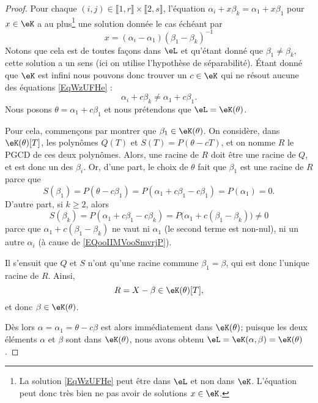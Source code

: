 \begin{proof}
    Pour chaque \( (i,j)\in \llbracket 1,r\rrbracket \times \llbracket 2,s\rrbracket \), l'équation \( \alpha_i+x\beta_k=\alpha_1+x\beta_1\) pour \( x\in \eK\) a au plus\footnote{La solution \eqref{EqWzUFHe} peut être dans $ \eL$ et non dans $\eK$. L'équation peut donc très bien ne pas avoir de solutions $x\in \eK$.} une solution donnée le cas échéant par
    \begin{equation}    \label{EqWzUFHe}
        x=(\alpha_i-\alpha_1)(\beta_1-\beta_k)^{-1}
    \end{equation}
    Notons que cela est de toutes façons dans \( \eL\) et qu'étant donné que \( \beta_1\neq \beta_k\), cette solution a un sens (ici on utilise l'hypothèse de séparabilité). Étant donné que \( \eK\) est infini nous pouvons donc trouver un \( c\in \eK\) qui ne résout aucune des équations \eqref{EqWzUFHe} :
    \begin{equation}\label{EQooIIMVooSmvrjP}
        \alpha_i+c\beta_k\neq \alpha_1+c\beta_1.
    \end{equation}
    Nous posons \( \theta=\alpha_1+c\beta_1\) et nous prétendons que \( \eL=\eK(\theta)\).

    Pour cela, commençons par montrer que \( \beta_1 \in \eK(\theta)\). On considère, dans \( \eK(\theta)[T]\), les polynômes \( Q(T)\) et \( S(T)=P(\theta-cT)\), et on nomme \( R\) le PGCD de ces deux polynômes. Alors, une racine de \( R\) doit être une racine de \( Q\), et est donc un des \( \beta_i\). Or, d'une part, le choix de \( \theta\) fait que \( \beta_1\) est une racine de \( R\) parce que
    \begin{equation}
        S(\beta_1)=P(\theta-c\beta_1)=P(\alpha_1+c\beta_1-c\beta_1)=P(\alpha_1)=0.
    \end{equation}
    D'autre part, si \( k\geq 2\), alors
    \begin{equation}
        S(\beta_k)=P(\alpha_1 + c \beta_1 - c \beta_k) = P\big(\alpha_1 +c(\beta_1-\beta_k)\big)\neq 0
    \end{equation}
    parce que \( \alpha_1 +c(\beta_1 - \beta_k)\) ne vaut ni \( \alpha_1 \) (le second terme est non-nul), ni un autre \( \alpha_i\) (à cause de \eqref{EQooIIMVooSmvrjP}).

    Il s'ensuit que \( Q \) et \(S \) n'ont qu'une racine commune \( \beta_1 = \beta \), qui est donc l'unique racine de \( R\). Ainsi,
    \begin{equation}
        R=X-\beta\in \eK(\theta)[T],
    \end{equation}
    et donc \( \beta\in \eK(\theta)\).

    Dès lors \( \alpha=\alpha_1=\theta-c\beta\) est alors immédiatement dans \( \eK(\theta)\); puisque les deux éléments \( \alpha\) et \( \beta\) sont dans \( \eK(\theta)\), nous avons obtenu \( \eL=\eK(\alpha,\beta)=\eK(\theta)\).

\end{proof}

